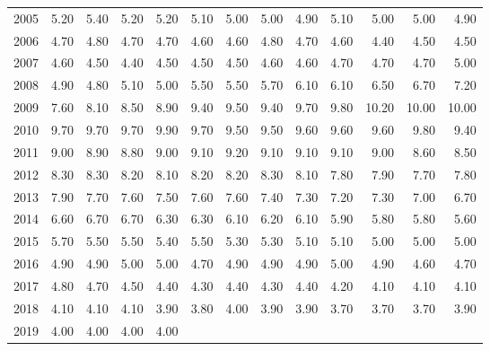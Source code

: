 \begin{longtable}{rrrrrrrrrrrrr}
  2005 & 5.20 & 5.40 & 5.20 & 5.20 & 5.10 & 5.00 & 5.00 & 4.90 & 5.10 & 5.00 & 5.00 & 4.90 \\ 
  2006 & 4.70 & 4.80 & 4.70 & 4.70 & 4.60 & 4.60 & 4.80 & 4.70 & 4.60 & 4.40 & 4.50 & 4.50 \\ 
  2007 & 4.60 & 4.50 & 4.40 & 4.50 & 4.50 & 4.50 & 4.60 & 4.60 & 4.70 & 4.70 & 4.70 & 5.00 \\ 
  2008 & 4.90 & 4.80 & 5.10 & 5.00 & 5.50 & 5.50 & 5.70 & 6.10 & 6.10 & 6.50 & 6.70 & 7.20 \\ 
  2009 & 7.60 & 8.10 & 8.50 & 8.90 & 9.40 & 9.50 & 9.40 & 9.70 & 9.80 & 10.20 & 10.00 & 10.00 \\ 
  2010 & 9.70 & 9.70 & 9.70 & 9.90 & 9.70 & 9.50 & 9.50 & 9.60 & 9.60 & 9.60 & 9.80 & 9.40 \\ 
  2011 & 9.00 & 8.90 & 8.80 & 9.00 & 9.10 & 9.20 & 9.10 & 9.10 & 9.10 & 9.00 & 8.60 & 8.50 \\ 
  2012 & 8.30 & 8.30 & 8.20 & 8.10 & 8.20 & 8.20 & 8.30 & 8.10 & 7.80 & 7.90 & 7.70 & 7.80 \\ 
  2013 & 7.90 & 7.70 & 7.60 & 7.50 & 7.60 & 7.60 & 7.40 & 7.30 & 7.20 & 7.30 & 7.00 & 6.70 \\ 
  2014 & 6.60 & 6.70 & 6.70 & 6.30 & 6.30 & 6.10 & 6.20 & 6.10 & 5.90 & 5.80 & 5.80 & 5.60 \\ 
  2015 & 5.70 & 5.50 & 5.50 & 5.40 & 5.50 & 5.30 & 5.30 & 5.10 & 5.10 & 5.00 & 5.00 & 5.00 \\ 
  2016 & 4.90 & 4.90 & 5.00 & 5.00 & 4.70 & 4.90 & 4.90 & 4.90 & 5.00 & 4.90 & 4.60 & 4.70 \\ 
  2017 & 4.80 & 4.70 & 4.50 & 4.40 & 4.30 & 4.40 & 4.30 & 4.40 & 4.20 & 4.10 & 4.10 & 4.10 \\ 
  2018 & 4.10 & 4.10 & 4.10 & 3.90 & 3.80 & 4.00 & 3.90 & 3.90 & 3.70 & 3.70 & 3.70 & 3.90 \\ 
  2019 & 4.00 & 4.00 & 4.00 & 4.00 &  &  &  &  &  &  &  &  \\ 
   \hline
\hline
\end{longtable}
